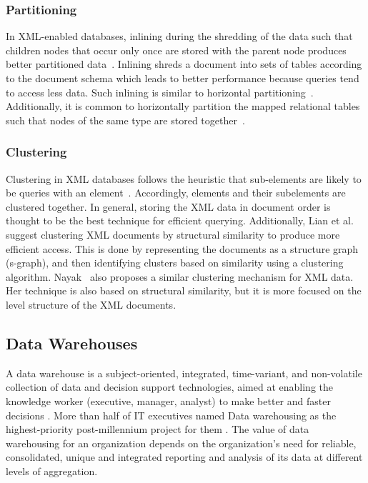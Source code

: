 \documentclass[12pt,a4paper]{article}
\begin{document}
\subsubsection{Partitioning}
In XML-enabled databases, inlining during the shredding of the data such that children nodes that occur only once are stored with the parent node produces
better partitioned data~\cite{tatarinov2002storing}. Inlining shreds a document into sets of tables according to the document schema which leads to better
performance because queries tend to access less data. Such inlining is similar to horizontal partitioning~\cite{ramanath2003searching}. Additionally, it is
common to horizontally partition the mapped relational tables such that nodes of the same type are stored together~\cite{amer2002overview}.

\subsubsection{Clustering}
Clustering in XML databases follows the heuristic that sub-elements are likely to be queries with an element~\cite{jagadish2002timber}. Accordingly, elements
and their subelements are clustered together. In general, storing the XML data in document order is thought to be the best technique for efficient querying.
Additionally, Lian et al.~\cite{lian2004efficient} suggest clustering XML documents by structural similarity to produce more efficient access. This is done by
representing the documents as a structure graph (s-graph), and then identifying clusters based on similarity using a clustering algorithm.
Nayak~\cite{nayak2008fast} also proposes a similar clustering mechanism for XML data. Her technique is also based on structural similarity, but it is more
focused on the level structure of the XML documents.


\subsection{Data Warehouses}
\label{SEC-WAREHOUSES}
A data warehouse is a subject-oriented, integrated, time-variant, and non-volatile collection of data and decision support technologies, aimed at enabling the
knowledge worker (executive, manager, analyst) to make better and faster decisions \cite{inmon2002building, chaudhuri1997overview}. More than half of IT
executives named Data warehousing as the highest-priority post-millennium project for them \cite{sen2005comparison}. The value of data warehousing for an
organization depends on the organization's need for reliable, consolidated, unique and integrated reporting and analysis of its data at different levels of
aggregation.
\end{document}
